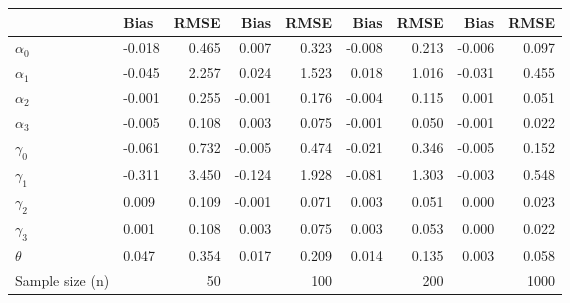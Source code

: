 
\begin{tabular}[t]{llrrrrrrr}
\toprule
  & Bias & RMSE & Bias & RMSE & Bias & RMSE & Bias & RMSE\\
\midrule
$\alpha_{0}$ & -0.018 & 0.465 & 0.007 & 0.323 & -0.008 & 0.213 & -0.006 & 0.097\\
$\alpha_{1}$ & -0.045 & 2.257 & 0.024 & 1.523 & 0.018 & 1.016 & -0.031 & 0.455\\
$\alpha_{2}$ & -0.001 & 0.255 & -0.001 & 0.176 & -0.004 & 0.115 & 0.001 & 0.051\\
$\alpha_{3}$ & -0.005 & 0.108 & 0.003 & 0.075 & -0.001 & 0.050 & -0.001 & 0.022\\
$\gamma_{0}$ & -0.061 & 0.732 & -0.005 & 0.474 & -0.021 & 0.346 & -0.005 & 0.152\\
$\gamma_{1}$ & -0.311 & 3.450 & -0.124 & 1.928 & -0.081 & 1.303 & -0.003 & 0.548\\
$\gamma_{2}$ & 0.009 & 0.109 & -0.001 & 0.071 & 0.003 & 0.051 & 0.000 & 0.023\\
$\gamma_{3}$ & 0.001 & 0.108 & 0.003 & 0.075 & 0.003 & 0.053 & 0.000 & 0.022\\
$\theta$ & 0.047 & 0.354 & 0.017 & 0.209 & 0.014 & 0.135 & 0.003 & 0.058\\
Sample size (n) &  & 50 &  & 100 &  & 200 &  & 1000\\
\bottomrule
\end{tabular}
